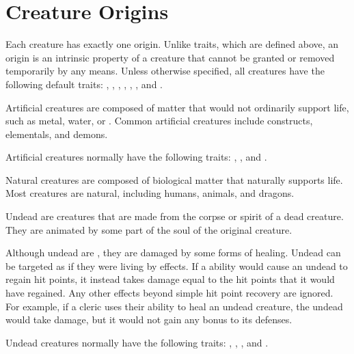 \newpage
\section{Creature Origins}\label{Creature Origins}


  Each creature has exactly one origin.
  Unlike traits, which are defined above, an origin is an intrinsic property of a creature that cannot be granted or removed temporarily by any means.
  Unless otherwise specified, all creatures have the following default traits: , , , , , , and .

  Artificial creatures are composed of matter that would not ordinarily support life, such as metal, water, or .
  Common artificial creatures include constructs, elementals, and demons.

  Artificial creatures normally have the following traits: , , and .

  Natural creatures are composed of biological matter that naturally supports life. 
  Most creatures are natural, including humans, animals, and dragons.

  Undead are creatures that are made from the corpse or spirit of a dead creature.
  They are animated by some part of the soul of the original creature.

  Although undead are , they are damaged by some forms of healing.
  Undead can be targeted as if they were living  by \magical \atLife effects.
  If a \magical \atLife ability would cause an undead to regain hit points, it instead takes damage equal to the hit points that it would have regained. 
  Any other effects beyond simple hit point recovery are ignored.
  For example, if a cleric uses their  ability to heal an undead creature, the undead would take damage, but it would not gain any bonus to its defenses.

  Undead creatures normally have the following traits: , , , and .


